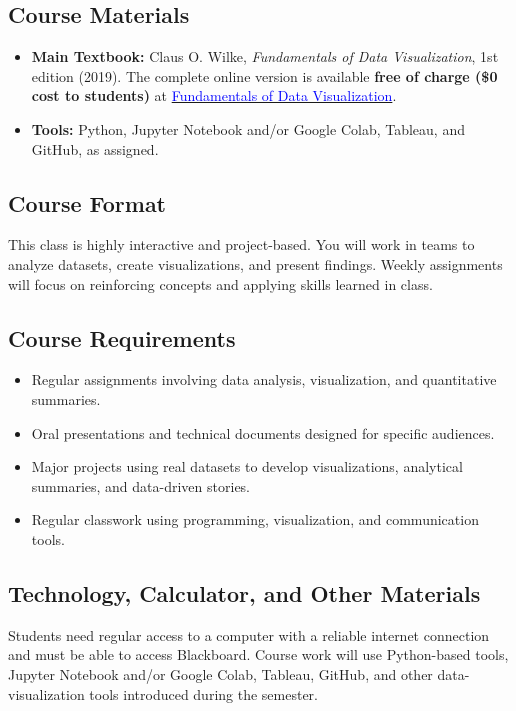 \documentclass{exam}
\begin{document}
\subsection*{Course Materials}
\begin{itemize}
    \item \textbf{Main Textbook:} Claus O. Wilke, \textit{Fundamentals of Data Visualization}, 1st edition (2019). The complete online version is available \textbf{free of charge (\$0 cost to students)} at \href{https://clauswilke.com/dataviz/}{\textcolor{blue}{Fundamentals of Data Visualization}}.
    \item \textbf{Tools:} Python, Jupyter Notebook and/or Google Colab, Tableau, and GitHub, as assigned.
\end{itemize}

\subsection*{Course Format}
This class is highly interactive and project-based. You will work in teams to analyze datasets, create visualizations, and present findings. Weekly assignments will focus on reinforcing concepts and applying skills learned in class.

\subsection*{Course Requirements}
\begin{itemize}
    \item Regular assignments involving data analysis, visualization, and quantitative summaries.
    \item Oral presentations and technical documents designed for specific audiences.
    \item Major projects using real datasets to develop visualizations, analytical summaries, and data-driven stories.
    \item Regular classwork using programming, visualization, and communication tools.
\end{itemize}

\subsection*{Technology, Calculator, and Other Materials}
Students need regular access to a computer with a reliable internet connection and must be able to access Blackboard. Course work will use Python-based tools, Jupyter Notebook and/or Google Colab, Tableau, GitHub, and other data-visualization tools introduced during the semester.
\end{document}
